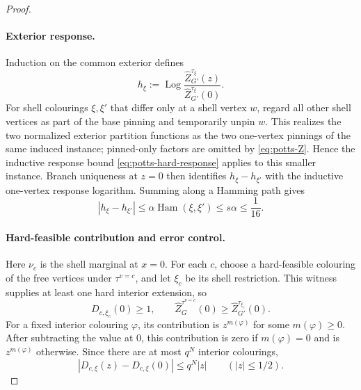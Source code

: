 \documentclass[11pt,reqno]{article}
\theoremstyle{plain}
\theoremstyle{definition}
\theoremstyle{remark}
\theoremstyle{definition}
\theoremstyle{remark}
\newcommand{\Log}{\operatorname{Log}}          %
\DeclareMathOperator{\Ham}{Ham}
\newcommand{\nZpin}[2]{\widehat Z_{#1}^{#2}}
\begin{document}
\begin{proof}
\paragraph{Exterior response.}
Induction on the common exterior defines
\[
  h_\xi:=\Log
  \frac{\nZpin{G'}{\tau_\xi}(z)}
       {\nZpin{G'}{\tau_\xi}(0)}.
\]
For shell colourings \(\xi,\xi'\) that differ only at a shell vertex
\(w\), regard all other shell vertices as part of the base pinning and
temporarily unpin \(w\).
This realizes the two normalized exterior partition functions as the
two one-vertex pinnings
of the same induced instance; pinned-only factors are omitted by
\eqref{eq:potts-Z}.  Hence the inductive response bound
\eqref{eq:potts-hard-response} applies to this smaller instance.  Branch
uniqueness at \(z=0\) then identifies \(h_\xi-h_{\xi'}\) with the inductive
one-vertex response logarithm.  Summing along a Hamming path gives
\[
  |h_\xi-h_{\xi'}|
  \le\alpha\Ham(\xi,\xi')
  \le s\alpha
  \le\frac1{16}.
\]
\paragraph{Hard-feasible contribution and error control.}
Here \(\nu_c\) is the shell marginal at \(x=0\).  For each \(c\), choose a
hard-feasible colouring of the free vertices under \(\tau^{v=c}\), and let
\(\xi_c\) be its shell restriction.
This witness supplies at least one hard interior extension, so
\[
  D_{c,\xi_c}(0)\ge1,
  \qquad
  \nZpin{G}{\tau^{v=c}}(0)
  \ge \nZpin{G'}{\tau_{\xi_c}}(0).
\]
For a fixed interior colouring \(\varphi\), its contribution is
\(z^{m(\varphi)}\) for some \(m(\varphi)\ge0\).  After subtracting the value
at \(0\), this contribution is zero if \(m(\varphi)=0\) and is
\(z^{m(\varphi)}\) otherwise.  Since there are at most \(q^N\) interior
colourings,
\[
  |D_{c,\xi}(z)-D_{c,\xi}(0)|\le q^N|z|
  \qquad(|z|\le1/2).
\]


\end{proof}
\end{document}
